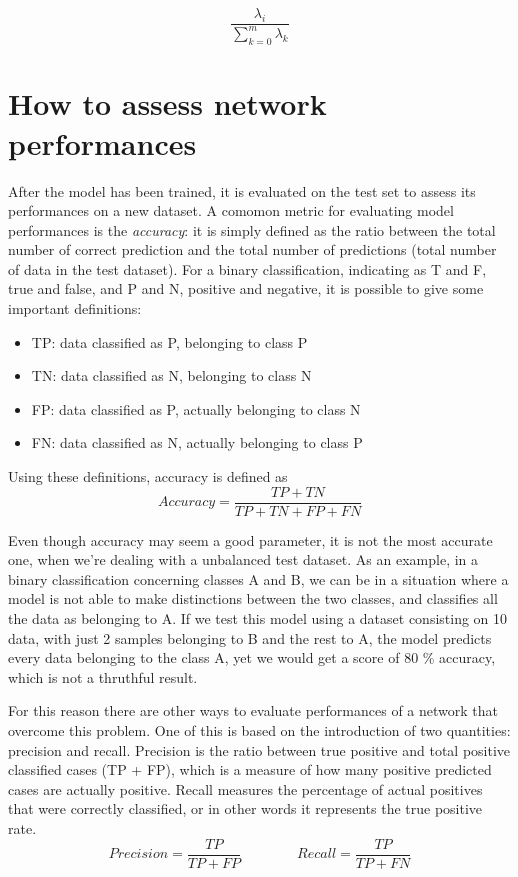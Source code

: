 \documentclass[11pt]{report}
\begin{document}
\begin{equation}
\frac{\lambda_i}{\sum_{k = 0}^m \lambda_k}
\end{equation}




\section{How to assess network performances}
After the model has been trained, it is evaluated on the test set to assess its performances on a new dataset.
A comomon metric for evaluating model performances is the \emph{accuracy}: it is simply defined as the ratio between the total number of correct prediction and the total number of predictions (total number of data in the test dataset).
For a binary classification, indicating as T and F, true and false, and P and N, positive and negative, it is possible to give some important definitions:
\begin{itemize}
\item TP: data classified as P, belonging to class P
\item TN: data classified as N, belonging to class N
\item FP: data classified as P, actually belonging to class N
\item FN: data classified as N, actually belonging to class P
\end{itemize}

Using these definitions, accuracy is defined as
\begin{equation}
Accuracy = \frac{TP + TN}{TP+TN+FP+FN}
\end{equation}

Even though accuracy may seem a good parameter, it is not the most accurate one, when we're dealing with a unbalanced test dataset.
As an example, in a binary classification concerning classes A and B, we can be in a situation where a model is not able to make distinctions between the two classes, and classifies all the data as belonging to A.
If we test this model using a dataset consisting on 10 data, with just 2 samples belonging to B and the rest to A, the model predicts every data belonging to the class A, yet we would get a score of 80 \% accuracy, which is not a thruthful result.

For this reason there are other ways to evaluate performances of a network that overcome this problem.
One of this is based on the introduction of two quantities: precision and recall.
Precision is the ratio between true positive and total positive classified cases (TP + FP), which is a measure of how many positive predicted cases are actually positive.
Recall measures the percentage of actual positives that were correctly classified, or in other words it represents the true positive rate.
\begin{equation}
Precision = \frac{TP}{TP+FP} \qquad \qquad Recall = \frac{TP}{TP+FN}
\end{equation}
\end{document}
